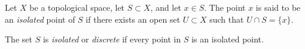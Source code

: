 \documentclass{article}
\begin{document}
Let $X$ be a topological space, let $S \subset X$, and let $x \in S$. The point $x$ is said to be an \emph{isolated} point of $S$ if there exists an open set $U \subset X$ such that $U \cap S = \{x\}$.

The set $S$ is \emph{isolated} or \emph{discrete} if every point in $S$ is an isolated point.
\end{document}
